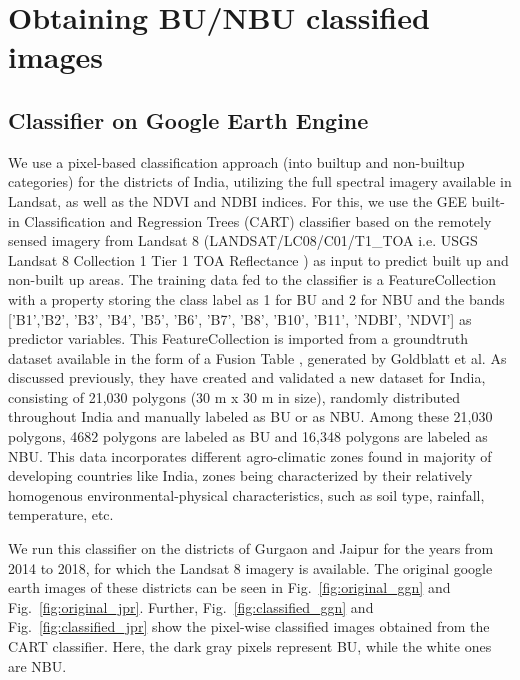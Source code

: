\section{Obtaining BU/NBU classified images}
\label{method:obtainimages}

\subsection{Classifier on Google Earth Engine}

We use a pixel-based classification approach (into builtup and non-builtup categories) for the districts of India, utilizing the full spectral imagery available in Landsat, as well as the NDVI and NDBI indices. For this, we use the GEE built-in Classification and Regression Trees (CART) classifier \cite{breiman1984classification} based on the remotely sensed imagery from Landsat 8 (LANDSAT/LC08/C01/T1\_TOA i.e. USGS Landsat 8 Collection 1 Tier 1 TOA Reflectance \cite{LS8}) as input to predict built up and non-built up areas. The training data fed to the classifier is a FeatureCollection with a property storing the class label as 1 for BU and 2 for NBU and the bands ['B1','B2', 'B3', 'B4', 'B5', 'B6', 'B7', 'B8', 'B10', 'B11', 'NDBI', 'NDVI'] as predictor variables. This FeatureCollection is imported from a groundtruth dataset available in the form of a Fusion Table \cite{DATASETGOLDBLATT}, generated by Goldblatt et al.\cite{goldblatt2016detecting} As discussed previously, they have created and validated a new dataset for India, consisting of 21,030 polygons (30 m x 30 m in size), randomly distributed throughout India and manually labeled as BU or as NBU. Among these 21,030 polygons, 4682 polygons are labeled as BU and 16,348 polygons are labeled as NBU. This data incorporates different agro-climatic zones found in majority of developing countries like India, zones being characterized by their relatively homogenous environmental-physical characteristics, such as soil type, rainfall, temperature, etc.

We run this classifier on the districts of Gurgaon and Jaipur for the years from 2014 to 2018, for which the Landsat 8 imagery is available. The original google earth images of these districts can be seen in Fig.~\ref{fig:original_ggn} and Fig.~\ref{fig:original_jpr}. Further, Fig.~\ref{fig:classified_ggn} and Fig.~\ref{fig:classified_jpr} show the pixel-wise classified images obtained from the CART classifier. Here, the dark gray pixels represent BU, while the white ones are NBU.

